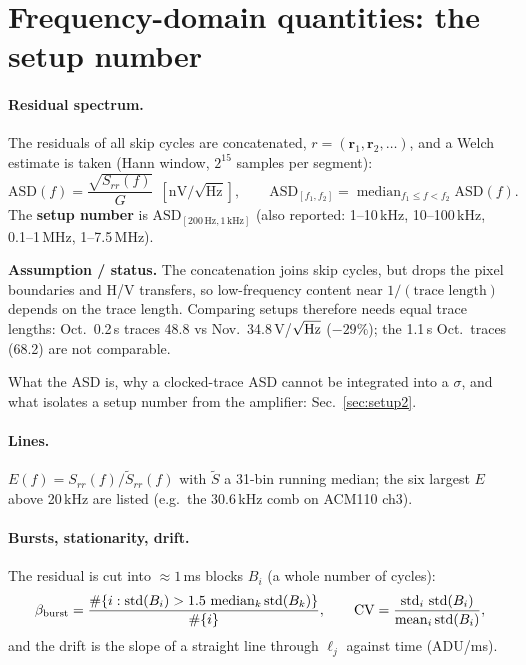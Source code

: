 \documentclass[10pt,a4paper]{article}
\newcommand{\std}{\operatorname{std}}
\newcommand{\med}{\operatorname{median}}
\newcommand{\caveat}[1]{\par\smallskip\noindent\colorbox{orange!10}{\parbox{\dimexpr\linewidth-2\fboxsep}{\small\textbf{Assumption / status.} #1}}\par\smallskip}
\begin{document}
\section{Frequency-domain quantities: the setup number}

\paragraph{Residual spectrum.} The residuals of all skip cycles are concatenated, $r=(\mathbf r_1,\mathbf r_2,\dots)$,
and a Welch estimate \cite{welch1967} is taken (Hann window, $2^{15}$ samples per segment):
\begin{equation}
\text{ASD}(f)=\frac{\sqrt{S_{rr}(f)}}{G}\ \ [\text{nV}/\sqrt{\text{Hz}}],\qquad
\text{ASD}_{[f_1,f_2]}=\med_{f_1\le f<f_2}\text{ASD}(f).
\end{equation}
The \textbf{setup number} is $\text{ASD}_{[200\,\text{Hz},1\,\text{kHz}]}$ (also reported: 1--10\,kHz, 10--100\,kHz,
0.1--1\,MHz, 1--7.5\,MHz).
\caveat{The concatenation joins skip cycles, but drops the pixel boundaries and H/V transfers, so low-frequency
content near $1/(\text{trace length})$ depends on the trace length. Comparing setups therefore needs equal trace
lengths: Oct.\ 0.2\,s traces 48.8 vs Nov.\ 34.8\,\textmu V/$\sqrt{\rm Hz}$ ($-29\%$); the 1.1\,s Oct.\ traces (68.2)
are not comparable.}
What the ASD is, why a clocked-trace ASD cannot be integrated into a $\sigma$, and what isolates a setup number from
the amplifier: Sec.~\ref{sec:setup2}.

\paragraph{Lines.} $E(f)=S_{rr}(f)/\widetilde S_{rr}(f)$ with $\widetilde S$ a 31-bin running median; the six largest
$E$ above 20\,kHz are listed (e.g.\ the 30.6\,kHz comb on ACM110 ch3).

\paragraph{Bursts, stationarity, drift.} The residual is cut into $\approx1$\,ms blocks $B_i$ (a whole number of
cycles):
\begin{equation}
\beta_{\rm burst}=\frac{\#\{i:\std(B_i)>1.5\,\med_k\std(B_k)\}}{\#\{i\}},\qquad
\text{CV}=\frac{\std_i\,\std(B_i)}{\operatorname{mean}_i\std(B_i)},
\end{equation}
and the drift is the slope of a straight line through $\ell_j$ against time (ADU/ms).
\end{document}
